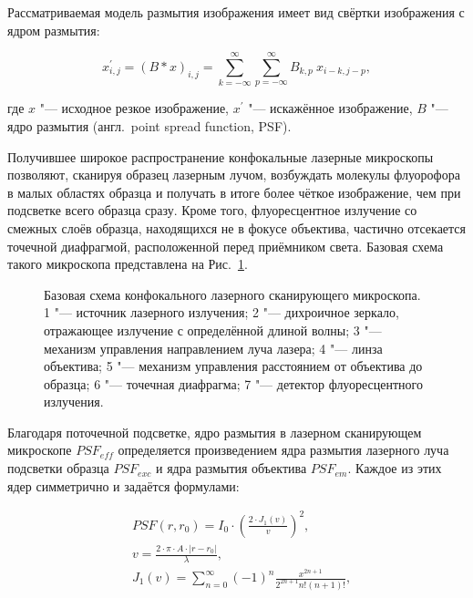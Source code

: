 Рассматриваемая модель размытия изображения имеет вид свёртки изображения с ядром размытия:

\begin{equation*}
	x^\prime_{i,j} = \left(B \ast x\right)_{i,j} = \sum_{k=-\infty}^{\infty} \sum_{p=-\infty}^{\infty}{B_{k,p}\ x_{i-k,j-p}},
\end{equation*}

\noindent где $x$ "--- исходное резкое изображение, $x^\prime$ "--- искажённое изображение, $B$ "--- ядро размытия (англ.~point spread function, PSF).

Получившее широкое распространение конфокальные лазерные микроскопы позволяют, сканируя образец лазерным лучом, возбуждать молекулы флуорофора в малых областях образца и получать в итоге более чёткое изображение, чем  при подсветке всего образца сразу. Кроме того, флуоресцентное излучение со смежных слоёв образца, находящихся не в фокусе объектива, частично отсекается точечной диафрагмой, расположенной перед приёмником света. Базовая схема такого микроскопа представлена на Рис.~\ref{fig:sinopsis-scanning-microscope-scheme}.

\begin{figure}[ht]
	\caption{Базовая схема конфокального лазерного сканирующего микроскопа. 1 "--- источник лазерного излучения; 2 "--- дихроичное зеркало, отражающее излучение с определённой длиной волны; 3 "--- механизм управления направлением луча лазера; 4 "--- линза объектива; 5 "--- механизм управления расстоянием от объектива до образца; 6 "--- точечная диафрагма; 7 "--- детектор флуоресцентного излучения.}
	\label{fig:sinopsis-scanning-microscope-scheme}
\end{figure}

Благодаря поточечной подсветке, ядро размытия в лазерном сканирующем микроскопе $PSF_{eff}$ определяется произведением ядра размытия лазерного луча подсветки образца $PSF_{exc}$ и ядра размытия объектива $PSF_{em}$.
Каждое из этих ядер симметрично и задаётся формулами:

\begin{align*}
	&PSF\left(r, r_0\right) = I_0 \cdot \left(\frac{2\cdot J_1\left(v\right)}{v}\right)^2, \\
	&v=\frac{2\cdot\pi\cdot A\cdot\left|r-r_0\right|}{\lambda}, \\
	&J_1(v)=\sum_{n=0}^{\infty}{\left(-1\right)^n\frac{x^{2n+1}}{2^{2n+1}n!\left(n+1\right)!}},
\end{align*}

